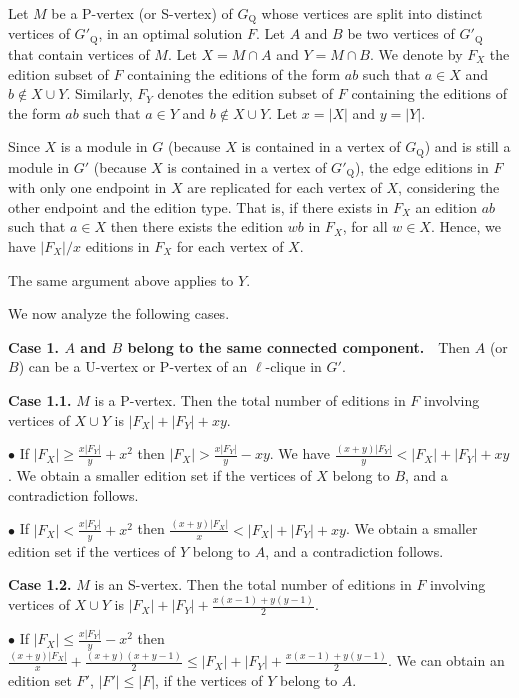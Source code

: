 \documentclass[12pt]{article}
\begin{document}
Let $M$ be a P-vertex (or S-vertex) of $G_{\mathrm Q}$ whose
vertices are split into distinct vertices of $G'_{\mathrm Q}$, in an
optimal solution $F$. Let $A$ and $B$ be two vertices of
$G'_{\mathrm Q}$ that contain vertices of $M$. Let $X = M \cap A$
and $Y = M \cap B$. We denote by $F_X$ the edition subset of
$F$ containing the editions of the form $ab$ such that $a \in
X$ and $b \notin X \cup Y$. Similarly, $F_Y$ denotes the edition subset of $F$ containing the editions of the form $ab$
such that $a \in Y$ and $b \notin X \cup Y$. Let $x = |X|$ and $y
= |Y|$.

Since $X$ is a module in $G$ (because $X$ is contained in a vertex of $G_{\mathrm Q}$)
and is still a module in $G'$ (because $X$ is contained in a vertex of $G'_{\mathrm Q}$),
the edge editions in $F$ with only one endpoint in $X$ are
replicated for each vertex of $X$, considering the other endpoint and the edition type.
That is, if there exists in $F_X$ an edition $ab$ such that
$a \in X$ then there exists the edition $wb$ in $F_X$,
for all $w \in X$. Hence, we have $|F_X|/x$ editions in
$F_X$ for each vertex of $X$.

The same argument above applies to $Y$.

We now analyze the following cases.

\textbf{Case 1. $A$ and $B$ belong to the same connected
component.}\ \ Then $A$ (or $B$) can be a U-vertex or
P-vertex of an $\ell$-clique in $G'$.

\textbf{Case 1.1.} $M$ is a P-vertex. Then the total number of
editions in $F$ involving vertices of $X \cup Y$ is
$|F_X|+|F_Y|+xy$.

$\bullet$ If $|F_X| \geq \frac{x|F_Y|}{y} + x^2$ then $|F_X|>
\frac{x|F_Y|}{y}-xy$. We have $\frac{(x+y)|F_Y|}{y}<|F_X|+
|F_Y|+xy$. We obtain a smaller edition set if the vertices of
$X$ belong to $B$, and a contradiction follows.

$\bullet$ If $|F_X| < \frac{x|F_Y|}{y} + x^2$ then
$\frac{(x+y)|F_X|}{x}<|F_X|+ |F_Y|+xy$. We obtain a smaller edition set if the vertices of $Y$ belong to $A$, and a
contradiction follows.

\textbf{Case 1.2.} $M$ is an S-vertex. Then the total number of
editions in $F$ involving vertices of $X \cup Y$ is $|F_X|+|F_Y|+
\frac{x(x-1)+y(y-1)}{2}$.

$\bullet$ If $|F_X| \leq \frac{x|F_Y|}{y} - x^2$ then
$\frac{(x+y)|F_X|}{x}+ \frac{(x+y)(x+y-1)}{2}\leq |F_X| + |F_Y| +
\frac{x(x-1)+y(y-1)}{2}$. We can obtain an edition set $F'$,
$|F'|\leq|F|$, if the vertices of $Y$ belong to $A$.
\end{document}
